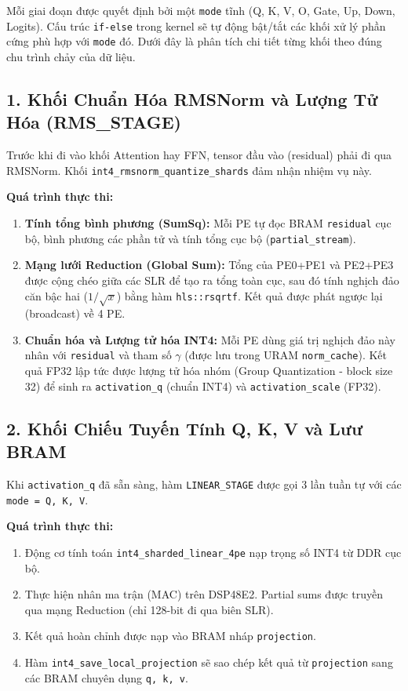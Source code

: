 \documentclass[12pt,a4paper]{article}
\begin{document}
Mỗi giai đoạn được quyết định bởi một \texttt{mode} tĩnh (Q, K, V, O, Gate, Up, Down, Logits). Cấu trúc \texttt{if-else} trong kernel sẽ tự động bật/tắt các khối xử lý phần cứng phù hợp với \texttt{mode} đó. Dưới đây là phân tích chi tiết từng khối theo đúng chu trình chảy của dữ liệu.

\subsection{1. Khối Chuẩn Hóa RMSNorm và Lượng Tử Hóa (RMS\_STAGE)}

Trước khi đi vào khối Attention hay FFN, tensor đầu vào (residual) phải đi qua RMSNorm. Khối \texttt{int4\_rmsnorm\_quantize\_shards} đảm nhận nhiệm vụ này.

\textbf{Quá trình thực thi:}
\begin{enumerate}
    \item \textbf{Tính tổng bình phương (SumSq):} Mỗi PE tự đọc BRAM \texttt{residual} cục bộ, bình phương các phần tử và tính tổng cục bộ (\texttt{partial\_stream}).
    \item \textbf{Mạng lưới Reduction (Global Sum):} Tổng của PE0+PE1 và PE2+PE3 được cộng chéo giữa các SLR để tạo ra tổng toàn cục, sau đó tính nghịch đảo căn bậc hai ($1/\sqrt{x}$) bằng hàm \texttt{hls::rsqrtf}. Kết quả được phát ngược lại (broadcast) về 4 PE.
    \item \textbf{Chuẩn hóa và Lượng tử hóa INT4:} Mỗi PE dùng giá trị nghịch đảo này nhân với \texttt{residual} và tham số $\gamma$ (được lưu trong URAM \texttt{norm\_cache}). Kết quả FP32 lập tức được lượng tử hóa nhóm (Group Quantization - block size 32) để sinh ra \texttt{activation\_q} (chuẩn INT4) và \texttt{activation\_scale} (FP32).
\end{enumerate}

\subsection{2. Khối Chiếu Tuyến Tính Q, K, V và Lưư BRAM}

Khi \texttt{activation\_q} đã sẵn sàng, hàm \texttt{LINEAR\_STAGE} được gọi 3 lần tuần tự với các \texttt{mode = Q, K, V}.

\textbf{Quá trình thực thi:}
\begin{enumerate}
    \item Động cơ tính toán \texttt{int4\_sharded\_linear\_4pe} nạp trọng số INT4 từ DDR cục bộ.
    \item Thực hiện nhân ma trận (MAC) trên DSP48E2. Partial sums được truyền qua mạng Reduction (chỉ 128-bit đi qua biên SLR).
    \item Kết quả hoàn chỉnh được nạp vào BRAM nháp \texttt{projection}.
    \item Hàm \texttt{int4\_save\_local\_projection} sẽ sao chép kết quả từ \texttt{projection} sang các BRAM chuyên dụng \texttt{q, k, v}.
\end{enumerate}
\end{document}
